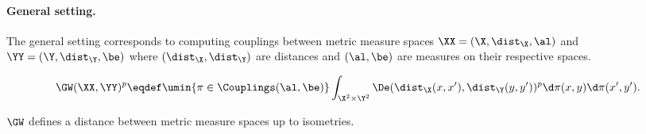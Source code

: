 \paragraph{General setting.}
The general setting corresponds to computing couplings between metric measure spaces $\XX=(\X,\dist_\X,\al)$ and $\YY=(\Y,\dist_\Y,\be)$ where $(\dist_\X,\dist_\Y)$ are distances and $(\al,\be)$ are measures on their respective spaces.

\begin{align}
\label{eq-gw-generic}
\GW( \XX,\YY )^p \eqdef
\umin{ \pi \in \Couplings(\al,\be) }
\int_{\X^2 \times \Y^2}
\De(\dist_\X(x,x'),\dist_\Y(y,y'))^p
\d\pi(x,y)\d\pi(x',y').
\end{align}
\begin{thm}
$\GW$ defines a distance between metric measure spaces up to isometries.
\end{thm}
